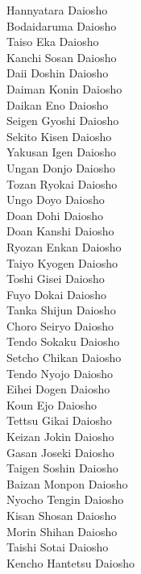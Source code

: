 \documentclass[12pt]{report}
\begin{document}
\begin{multicols*}{3}
  Hannyatara Daiosho         \\ 
  Bodaidaruma Daiosho        \\ 
  Taiso Eka Daiosho          \\ 
  Kanchi Sosan Daiosho       \\ 
  Daii Doshin Daiosho        \\ 
  Daiman Konin Daiosho       \\ 
  Daikan Eno Daiosho         \\ 
  Seigen Gyoshi Daiosho      \\ 
  Sekito Kisen Daiosho       \\ 
  Yakusan Igen Daiosho       \\ 
  Ungan Donjo Daiosho        \\ 
  Tozan Ryokai Daiosho       \\ 
  Ungo Doyo Daiosho          \\ 
  Doan Dohi Daiosho          \\ 
  Doan Kanshi Daiosho        \\ 
  Ryozan Enkan Daiosho       \\ 
  Taiyo Kyogen Daiosho       \\ 
  Toshi Gisei Daiosho        \\ 
  Fuyo Dokai Daiosho         \\ 
  Tanka Shijun Daiosho       \\ 
  Choro Seiryo Daiosho       \\ 
  Tendo Sokaku Daiosho       \\ 
  Setcho Chikan Daiosho      \\ 
  Tendo Nyojo Daiosho        \\ 
  Eihei Dogen Daiosho        \columnbreak \\
  Koun Ejo Daiosho           \\
  Tettsu Gikai Daiosho       \\ 
  Keizan Jokin Daiosho       \\ 
  Gasan Joseki Daiosho       \\ 
  Taigen Soshin Daiosho      \\ 
  Baizan Monpon Daiosho      \\ 
  Nyocho Tengin Daiosho      \\ 
  Kisan Shosan Daiosho       \\ 
  Morin Shihan Daiosho       \\ 
  Taishi Sotai Daiosho       \\ 
  Kencho Hantetsu Daiosho    \\ 

\end{multicols*}
\end{document}
